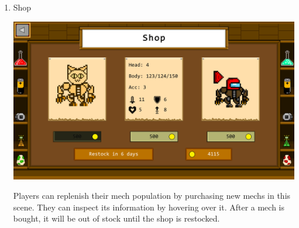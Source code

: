 \documentclass[12pt,oneside,openright,a4paper]{cpe-english-project}
\begin{document}
\begin{enumerate}
	\item Shop \\
	\begin{minipage}[c]{\textwidth}\centering
	\includegraphics[width=14cm]{figure/screenshot/screenshot-shop.png}
	\end{minipage}
	Players can replenish their mech population by purchasing new mechs in this scene. They can inspect its information by hovering over it. After a mech is bought, it will be out of stock until the shop is restocked.


\end{enumerate}
\end{document}

